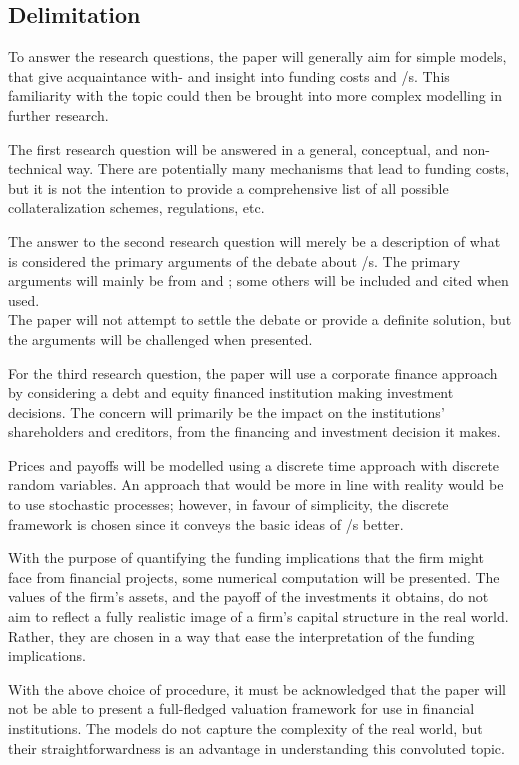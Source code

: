 \documentclass[main.tex]{subfiles}
\begin{document}
    \subsection{Delimitation}

    To answer the research questions, the paper will generally aim for simple models,
    that give acquaintance with- and insight into funding costs and \FVA/s.
    This familiarity with the topic could then be brought into more complex modelling
    in further research.

    The first research question will be answered in a general, conceptual, and 
    non-tech\-nical %
    way.
    There are potentially many mechanisms that lead to funding costs,
    but it is not the intention to provide a comprehensive list 
    of all possible collateralization schemes, regulations, etc.

    The answer to the second research question will merely be a description 
    of what is considered the primary arguments of the debate about \FVA/s.
    The primary arguments will mainly be from 
    \textcite{HullWhite2012FVA} and \textcite{Castagna2012FVA};
    some others will be included and cited when used.
    \\
    The paper will not attempt to settle the debate or provide a definite solution,
    but the arguments will be challenged when presented.

    For the third research question, the paper will use a corporate finance approach
    by considering a debt and equity financed institution making investment decisions.
    The concern will primarily be the impact on the institutions' shareholders and creditors,
    from the financing and investment decision it makes.

    Prices and payoffs will be modelled using a discrete time approach 
    with discrete random variables.
    An approach that would be more in line with reality would be to use stochastic processes;
    however, in favour of simplicity, the discrete framework is chosen 
    since it conveys the basic ideas of \FVA/s better.

    With the purpose of quantifying the funding implications that the firm might face from financial projects,
    some numerical computation will be presented.
    The values of the firm's assets, and the payoff of the investments it obtains,
    do not aim to reflect a fully realistic image of a firm's capital structure in the real world.
    Rather, they are chosen in a way that ease the interpretation of the funding implications.

    With the above choice of procedure, it must be acknowledged that the paper will not be able to
    present a full-fledged valuation framework for use in financial institutions.
    The models do not capture the complexity of the real world,
    but their straightforwardness is an advantage in understanding this convoluted topic.
\end{document}
